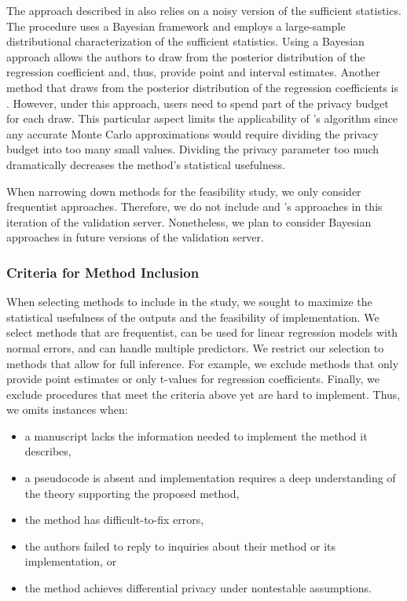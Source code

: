 The approach described in \citet{bernstein2019differentially} also relies on a noisy version of the sufficient statistics. The procedure uses a Bayesian framework and employs a large-sample distributional characterization of the sufficient statistics. Using a Bayesian approach allows the authors to draw from the posterior distribution of the regression coefficient and, thus, provide point and interval estimates. Another method that draws from the posterior distribution of the regression coefficients is \citet{wang2018revisiting}. However, under this approach, users need to spend part of the privacy budget for each draw. This particular aspect limits the applicability of \citet{wang2018revisiting}'s algorithm since any accurate Monte Carlo approximations would require dividing the privacy budget into too many small values. Dividing the privacy parameter too much dramatically decreases the method's statistical usefulness.

When narrowing down methods for the feasibility study, we only consider frequentist approaches. Therefore, we do not include \citet{bernstein2019differentially} and \citet{wang2018revisiting}'s approaches in this iteration of the validation server. Nonetheless, we plan to consider Bayesian approaches in future versions of the validation server.

\subsubsection{Criteria for Method Inclusion}

When selecting methods to include in the study, we sought to maximize the statistical usefulness of the outputs and the feasibility of implementation. We select methods that are frequentist, can be used for linear regression models with normal errors, and can handle multiple predictors. We restrict our selection to methods that allow for full inference. For example, we exclude methods that only provide point estimates or only t-values for regression coefficients. Finally, we exclude procedures that meet the criteria above yet are hard to implement. Thus, we omits instances when: 
\begin{itemize}
    \item a manuscript lacks the information needed to implement the method it describes,
    \item a pseudocode is absent and implementation requires a deep understanding of the theory supporting the proposed method,
    \item the method has difficult-to-fix errors,
    \item the authors failed to reply to inquiries about their method or its implementation, or
    \item the method achieves differential privacy under nontestable assumptions.
\end{itemize}

